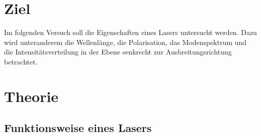 \section*{Ziel}
Im folgenden Versuch soll die Eigenschaften eines Lasers untersucht werden. 
Dazu wird unteranderem die Wellenlänge, die Polarisation, das Modenspektrum und die Intensitätsverteilung in der Ebene senkrecht zur Ausbreitungsrichtung betrachtet. 
\section{Theorie}
\subsection{Funktionsweise eines Lasers}

\label{sec:theorie}